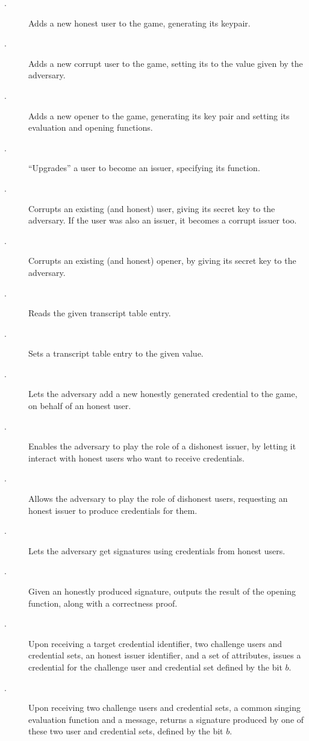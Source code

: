 \begin{description}
\item[\HUGEN.] Adds a new honest user to the game, generating its keypair.
\item[\CUGEN.] Adds a new corrupt user to the game, setting its \upk to the
  value given by the adversary.  
\item[\OGEN.] Adds a new opener to the game, generating its key pair and
  setting its evaluation and opening functions.
\item[\ISET.] ``Upgrades'' a user to become an issuer, specifying its
  \fissue function.
\item[\UCORR.] Corrupts an existing (and honest) user, giving its secret
  key to the adversary. If the user was also an issuer, it becomes a corrupt
  issuer too.
\item[\OCORR.] Corrupts an existing (and honest) opener, by giving its secret
  key to the adversary.
\item[\RREG.] Reads the given transcript table entry.
\item[\WREG.] Sets a transcript table entry to the given value.
\item[\OBTISS.] Lets the adversary add a new honestly generated credential to
  the game, on behalf of an honest user.
\item[\OBTAIN.] Enables the adversary to play the role of a dishonest issuer, by
  letting it interact with honest users who want to receive credentials.
\item[\ISSUE.] Allows the adversary to play the role of dishonest users,
  requesting an honest issuer to produce credentials for them.
\item[\SIGN.] Lets the adversary get signatures using credentials from honest
  users.
\item[\OPEN.] Given an honestly produced signature, outputs the result of the
  opening function, along with a correctness proof.
\item[\OBTCHALb.] Upon receiving a target credential identifier, two challenge
  users and credential sets, an honest issuer identifier, and a set of
  attributes, issues a credential for the challenge user and credential set
  defined by the bit $b$. 
\item[\CHALb.] Upon receiving two challenge users and credential sets, a common
  singing evaluation function and a message, returns a signature produced by one
  of these two user and credential sets, defined by the bit $b$.
\end{description}

